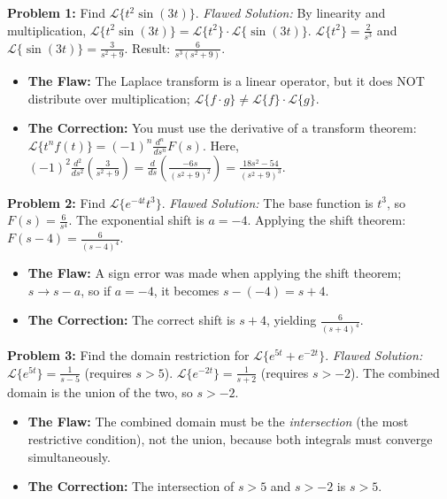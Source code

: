 \documentclass[11pt, a4paper]{article}
\theoremstyle{definition}
\theoremstyle{remark}
\begin{document}
\vspace{1em}
\textbf{Problem 1:} Find $\mathscr{L}\{t^2 \sin(3t)\}$.
\textit{Flawed Solution:} 
By linearity and multiplication, $\mathscr{L}\{t^2 \sin(3t)\} = \mathscr{L}\{t^2\} \cdot \mathscr{L}\{\sin(3t)\}$.
$\mathscr{L}\{t^2\} = \frac{2}{s^3}$ and $\mathscr{L}\{\sin(3t)\} = \frac{3}{s^2+9}$.
Result: $\frac{6}{s^3(s^2+9)}$.
\begin{itemize}
    \item \textbf{The Flaw:} The Laplace transform is a linear operator, but it does NOT distribute over multiplication; $\mathscr{L}\{f \cdot g\} \neq \mathscr{L}\{f\} \cdot \mathscr{L}\{g\}$.
    \item \textbf{The Correction:} You must use the derivative of a transform theorem: $\mathscr{L}\{t^n f(t)\} = (-1)^n \frac{d^n}{ds^n} F(s)$. Here, $(-1)^2 \frac{d^2}{ds^2} \left( \frac{3}{s^2+9} \right) = \frac{d}{ds} \left( \frac{-6s}{(s^2+9)^2} \right) = \frac{18s^2 - 54}{(s^2+9)^3}$.
\end{itemize}

\vspace{1em}
\textbf{Problem 2:} Find $\mathscr{L}\{e^{-4t} t^3\}$.
\textit{Flawed Solution:}
The base function is $t^3$, so $F(s) = \frac{6}{s^4}$. The exponential shift is $a = -4$.
Applying the shift theorem: $F(s-4) = \frac{6}{(s-4)^4}$.
\begin{itemize}
    \item \textbf{The Flaw:} A sign error was made when applying the shift theorem; $s \to s - a$, so if $a = -4$, it becomes $s - (-4) = s + 4$.
    \item \textbf{The Correction:} The correct shift is $s+4$, yielding $\frac{6}{(s+4)^4}$.
\end{itemize}

\vspace{1em}
\textbf{Problem 3:} Find the domain restriction for $\mathscr{L}\{e^{5t} + e^{-2t}\}$.
\textit{Flawed Solution:}
$\mathscr{L}\{e^{5t}\} = \frac{1}{s-5}$ (requires $s>5$). $\mathscr{L}\{e^{-2t}\} = \frac{1}{s+2}$ (requires $s>-2$).
The combined domain is the union of the two, so $s > -2$.
\begin{itemize}
    \item \textbf{The Flaw:} The combined domain must be the \textit{intersection} (the most restrictive condition), not the union, because both integrals must converge simultaneously.
    \item \textbf{The Correction:} The intersection of $s>5$ and $s>-2$ is $s>5$.
\end{itemize}
\end{document}
